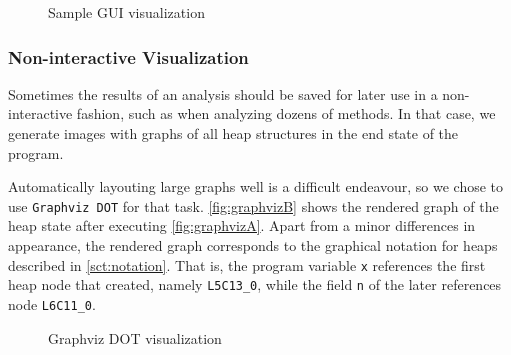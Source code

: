 \documentclass[11pt,a4paper,english]{article}
\begin{document}
\begin{figure}
  \caption{Sample GUI visualization}
  \label{fig:interactiveVisual}
\end{figure}

\subsubsection*{Non-interactive Visualization}
Sometimes the results of an analysis should be saved for later use in a
non-interactive fashion, such as when analyzing dozens of methods. In that case,
we generate images with graphs of all heap structures in the end state of the
program.

Automatically layouting large graphs well is a difficult endeavour, so we chose to
use \texttt{Graphviz DOT} for that task. \autoref{fig:graphvizB} shows the 
rendered graph of the heap state after executing \autoref{fig:graphvizA}. Apart
from a minor differences in appearance, the rendered graph corresponds to the
graphical notation for heaps described in \autoref{sct:notation}. That is, the program
variable \texttt{x} references the first heap node that created, namely
\texttt{L5C13\_0}, while the field \texttt{n} of the later references node
\texttt{L6C11\_0}.

\begin{figure}  
\centering
\begin{lrbox}{\mylistingbox}
\begin{minipage}[b]{.45\linewidth}

\end{minipage}
\end{lrbox}
\hspace{2cm}
\caption{Graphviz DOT visualization}
\label{fig:graphviz}
\end{figure}
\end{document}
